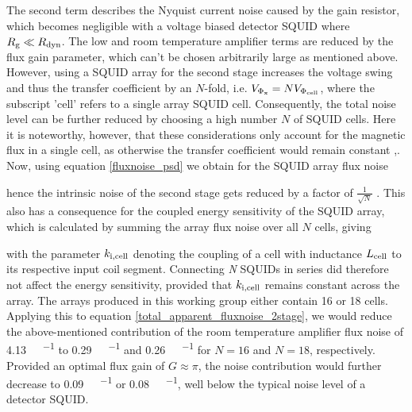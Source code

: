The second term describes the Nyquist current noise caused by the gain resistor, which becomes negligible with a voltage biased detector SQUID where $R_{\rm g}\ll R_{\rm dyn}$. The low and room temperature amplifier terms are reduced by the flux gain parameter, which can't be chosen arbitrarily large as mentioned above. However, using a SQUID array for the second stage increases the voltage swing and thus the transfer coefficient by an $N$-fold, i.e. $V_{\rm \Phi_x} = NV_{\rm \Phi_{cell}}$, where the subscript 'cell' refers to a single array SQUID cell. Consequently, the total noise level can be further reduced by choosing a high number $N$ of SQUID cells. Here it is noteworthy, however, that these considerations only account for the magnetic flux in a single cell, as otherwise the transfer coefficient would remain constant \cite{Stawiasz1993},\cite{Foglietti1993}.  Now, using equation \ref{fluxnoise_psd} we obtain for the SQUID array flux noise


hence the intrinsic noise of the second stage gets reduced by a factor of $\frac{1}{\sqrt{N}}$ \cite{Stawiasz1993}. This also has a consequence for the coupled energy sensitivity of the SQUID array, which is calculated by summing the array flux noise over all $N$ cells, giving




with the parameter $k_{\rm i,cell}$ denoting the coupling of a cell with inductance $L_{\rm cell}$ to its respective input coil segment. Connecting \textit{N} SQUIDs in series did therefore not affect the energy sensitivity, provided that $k_{\rm i,cell}$ remains constant across the array. The arrays produced in this working group either contain 16 \cite{Kempf2015} or 18 \cite{Krä2023} cells. Applying this to equation \ref{total_apparent_fluxnoise_2stage}, we would reduce the above-mentioned contribution of the room temperature amplifier flux noise of \qty{4.13}{\micro\fq\per\sqrthz} to \qty{0.29}{\micro\fq\per\sqrthz} and \qty{0.26}{\micro\fq\per\sqrthz} for $N=16$ and $N=18$, respectively. Provided an optimal flux gain of $G\approx\pi$, the noise contribution would further decrease to \qty{0.09}{\micro\fq\per\sqrthz} or \qty{0.08}{\micro\fq\per\sqrthz}, well below the typical noise level of a detector SQUID. \\

